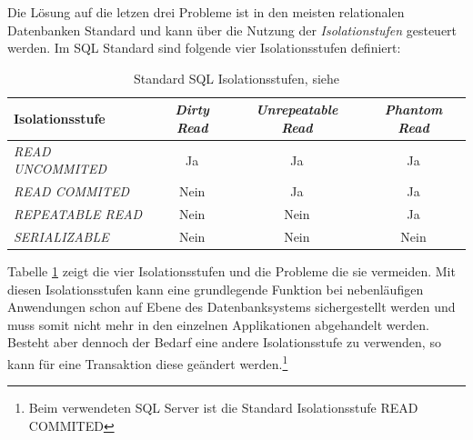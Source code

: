 Die Lösung auf die letzen drei Probleme ist in den meisten relationalen Datenbanken Standard und kann über die Nutzung der \emph{Isolationstufen} gesteuert werden. Im SQL Standard sind folgende vier Isolationsstufen definiert:
\begin{table}[]
	\centering
\begin{tabular}{|l|c|c|c|}
	\hline 
	\textbf{Isolationsstufe}& \textit{Dirty Read} & \textit{Unrepeatable Read} & \textit{Phantom Read} \\ 
	\hline 
	\textit{READ UNCOMMITED}& Ja & Ja & Ja \\ 
	\hline 
	\textit{READ COMMITED}& Nein & Ja  & Ja \\ 
	\hline 
	\textit{REPEATABLE READ}& Nein & Nein & Ja \\ 
	\hline 
	\textit{SERIALIZABLE}& Nein & Nein & Nein \\ 
	\hline 
\end{tabular} 
\caption{Standard SQL Isolationsstufen, siehe \parencite[S. 440]{dbgrund}}
\label{table:isolationlevel}
\end {table}
Tabelle \ref{table:isolationlevel} zeigt die vier Isolationsstufen und die Probleme die sie vermeiden. Mit diesen Isolationsstufen kann eine grundlegende Funktion bei nebenläufigen Anwendungen schon auf Ebene des Datenbanksystems sichergestellt werden und muss somit nicht mehr in den einzelnen Applikationen abgehandelt werden. Besteht aber dennoch der Bedarf eine andere Isolationsstufe zu verwenden, so kann für eine Transaktion diese geändert werden.\footnote{Beim verwendeten SQL Server ist die Standard Isolationsstufe READ COMMITED\parencite{ms_isolation}}
\chapterend
